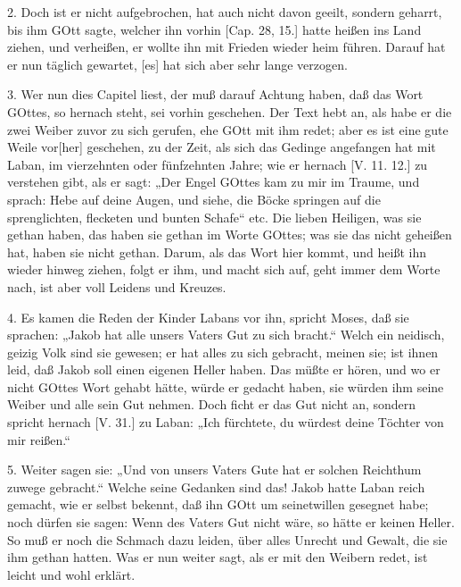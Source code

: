 2. Doch ist er nicht aufgebrochen, hat auch nicht davon geeilt, sondern geharrt, bis ihm GOtt sagte, welcher ihn vorhin [Cap. 28, 15.] hatte heißen ins Land ziehen, und verheißen, er wollte ihn mit Frieden wieder heim führen. Darauf hat er nun täglich gewartet, [es] hat sich aber sehr lange verzogen.

3. Wer nun dies Capitel liest, der muß darauf Achtung haben, daß das Wort GOttes, so hernach steht, sei vorhin geschehen. Der Text hebt an, als habe er die zwei Weiber zuvor zu sich gerufen, ehe GOtt mit ihm redet; aber es ist eine gute Weile vor[her] geschehen, zu der Zeit, als sich das Gedinge angefangen hat mit Laban, im vierzehnten oder fünfzehnten Jahre; wie er hernach [V. 11. 12.] zu verstehen gibt, als er sagt: „Der Engel GOttes kam zu mir im Traume, und sprach: Hebe auf deine Augen, und siehe, die Böcke springen auf die sprenglichten, flecketen und bunten Schafe“ etc. Die lieben Heiligen, was sie gethan haben, das haben sie gethan im Worte GOttes; was sie das nicht geheißen hat, haben sie nicht gethan. Darum, als das Wort hier kommt, und heißt ihn wieder hinweg ziehen, folgt er ihm, und macht sich auf, geht immer dem Worte nach, ist aber voll Leidens und Kreuzes.

4. Es kamen die Reden der Kinder Labans vor ihn, spricht Moses, daß sie sprachen: „Jakob hat alle unsers Vaters Gut zu sich bracht.“ Welch ein neidisch, geizig Volk sind sie gewesen; er hat alles zu sich gebracht, meinen sie; ist ihnen leid, daß Jakob soll einen eigenen Heller haben. Das müßte er hören, und wo er nicht GOttes Wort gehabt hätte, würde er gedacht haben, sie würden ihm seine Weiber und alle sein Gut nehmen. Doch ficht er das Gut nicht an, sondern spricht hernach [V. 31.] zu Laban: „Ich fürchtete, du würdest deine Töchter von mir reißen.“

5. Weiter sagen sie: „Und von unsers Vaters
Gute hat er solchen Reichthum zuwege gebracht.“ Welche seine Gedanken sind das! Jakob hatte Laban reich gemacht, wie er selbst bekennt, daß ihn GOtt um seinetwillen gesegnet habe; noch dürfen sie sagen: Wenn des Vaters Gut nicht wäre, so hätte er keinen Heller. So muß er noch die Schmach dazu leiden, über alles Unrecht und Gewalt, die sie ihm gethan hatten. Was er nun weiter sagt, als er mit den Weibern redet, ist leicht und wohl erklärt.

